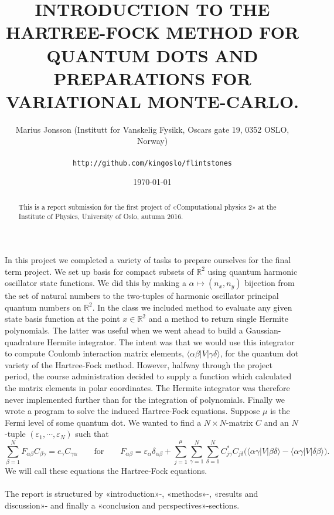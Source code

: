 \documentclass[11pt,english,a4paper]{article}
\author{\normalsize Marius Jonsson (Institutt for Vanskelig Fysikk, Oscars gate 19, 0352 OSLO, Norway) \\\\
\vspace{5px}
\normalsize \texttt{http://github.com/kingoslo/flintstones}}
\title{\bf \uppercase{Introduction to the Hartree-Fock method for quantum dots and preparations for variational monte-carlo.}}
\date{\normalsize \today}
\begin{document}
\maketitle
\begin{abstract} \normalsize This is a report submission for the first project of «Computational physics 2» at the Institute of Physics, University of Oslo, autumn 2016.
\end{abstract}
\lstset{
  xleftmargin=.2\textwidth, xrightmargin=.2\textwidth
}

In this project we completed a variety of tasks to prepare ourselves for the final term project. We set up basis for compact subsets of $\mathbb{R}^2$ using quantum harmonic oscillator state functions. We did this by making a $\alpha \mapsto (n_x,n_y)$ bijection from the set of natural numbers to the two-tuples of harmonic oscillator principal quantum numbers on $\mathbb{R}^2$. In the class we included method to evaluate any given state basis function at the point $x \in \mathbb{R}^2$ and a method to return single Hermite polynomials. The latter was useful when we went ahead to build a Gaussian-quadrature Hermite integrator. The intent was that we would use this integrator to compute Coulomb interaction matrix elements,  $\langle \alpha \beta | V | \gamma\delta \rangle$, for the quantum dot variety of the Hartree-Fock method. However, halfway through the project period, the course administration decided to supply a function which calculated the matrix elements in polar coordinates. The Hermite integrator was therefore never implemented further than for the integration of polynomials. Finally we wrote a program to solve the induced Hartree-Fock equations. Suppose $\mu$ is the Fermi level of some quantum dot. We wanted to find a $N \times N$-matrix $C$ and an $N$-tuple $(\varepsilon_1, \cdots, \varepsilon_N)$ such that
\begin{equation}
\sum_{  \beta = 1}^N F_{  \alpha \beta} C_{  \beta \gamma} = e_\gamma C_{  \gamma \alpha} \qquad \text{for} \qquad F_{  \alpha \beta} = \varepsilon_{  \alpha} \delta_{  \alpha \beta} + \sum_{  j=1}^\mu \sum_{  \gamma = 1}^N \sum_{  \delta = 1}^N C_{  j \gamma}^* C_{  j \delta} \Big( \langle \alpha \gamma | V | \beta \delta \rangle - \langle \alpha \gamma | V | \delta \beta \rangle \Big).
\label{eq:HF}
\end{equation}
We will call these equations the Hartree-Fock equations.
\\
\\
The report is structured by «introduction»-, «methods»-, «results and discussion»- and finally a «conclusion and perspectives»-sections.
\end{document}
